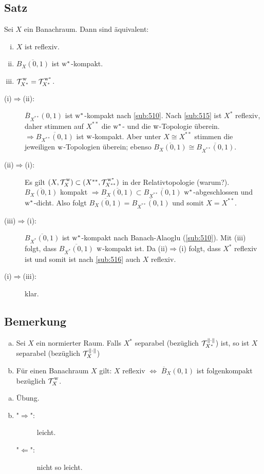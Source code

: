 \subsection{Satz} %
\label{sub:518}
Sei $X$ ein Banachraum. Dann sind äquivalent: 
\begin{enumerate}[(i)]
	\item $X$ ist reflexiv.
	\item $\overline{B_X(0,1)}$ ist $\mathrm{w}^*$-kompakt.
	\item $\weakT{X^*}= \weakTstar{X^*}$.
\end{enumerate}
\begin{description}
	\item[(i)$\Rightarrow$(ii):] $\overline{B}_{X^{**}}(0,1)$ ist $\mathrm{w}^*$-kompakt nach \ref{sub:510}. Nach \ref{sub:515} ist $X^*$ reflexiv, daher stimmen auf $X^{**}$
	die $\mathrm{w}^*$- und die $\mathrm{w}$-Topologie überein. $\Rightarrow \overline{B_{X^{**}}(0,1)}$ ist $\mathrm{w}$-kompakt. Aber unter $X \cong X^{**}$ stimmen die jeweiligen $\mathrm{w}$-Topologien
	überein; ebenso $\overline{B_{X}(0,1)} \cong \overline{B_{X^{**}}(0,1)}$.
	\item[(ii)$\Rightarrow$(i):] Es gilt $(X,\weakT{X}) \subset (X^{**}, \weakTstar{X^{**}})$ in der Relativtopologie (warum?).
	$\overline{B_X(0,1)}$ kompakt $\Rightarrow \overline{B_X(0,1)} \subset \overline{B_{X^{**}}(0,1)}$ $\mathrm{w}^*$-abgeschlossen und $\mathrm{w}^*$-dicht. Also folgt
	$\overline{B_X(0,1)} = \overline{B_{X^{**}}(0,1)}$ und somit $X=X^{**}$.
	\item[(iii)$\Rightarrow$(i):] $\overline{B_{X^*}(0,1)}$ ist $\mathrm{w}^*$-kompakt nach Banach-Alaoglu (\ref{sub:510}). Mit (iii) folgt, dass $\overline{B_{X^*}(0,1)}$
	$\mathrm{w}$-kompakt ist. Da (ii)$\Rightarrow$(i) folgt, dass $X^*$ reflexiv ist und somit ist nach \ref{sub:516} auch $X$ reflexiv.
	\item[(i)$\Rightarrow$(iii):] klar. \bewende
\end{description}

\subsection{Bemerkung} %
\label{sub:519}
\begin{enumerate}[a)]
	\item Sei $X$ ein normierter Raum. Falls $X^*$ separabel (bezüglich $\mathcal{T}_{X^*}^{\norm{\cdot}}$) ist, so ist $X$ separabel (bezüglich 
	$\mathcal{T}_X^{\norm{\cdot}}$)
	\item Für einen Banachraum $X$ gilt: $X$ reflexiv $\iff$ $\overline{B}_X(0,1)$ ist folgenkompakt bezüglich $\weakT{X}$.
\end{enumerate}
\begin{enumerate}[a)]
	\item Übung.
	\item \begin{description}
		\item["$\Rightarrow$":] leicht.
		\item["$\Leftarrow$":] nicht so leicht. 
	\end{description}
\end{enumerate}
\newpage

